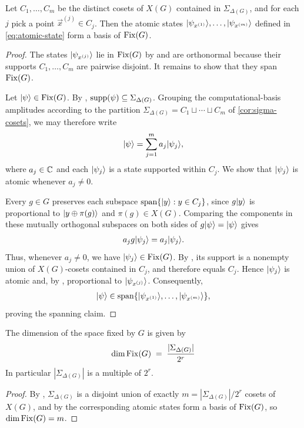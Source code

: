 \begin{theorem}\label{thm:atomic-basis}
    Let $C_1, \dots, C_m$ be the distinct cosets of $X(G)$ contained in $\Sigma_{\Delta(G)}$, and for each $j$ pick a point $\vec{x}^{(j)} \in C_j$. Then the atomic states $|\psi_{x^{(1)}}\rangle, \dots, |\psi_{x^{(m)}}\rangle$ defined in \cref{eq:atomic-state} form a basis of $\operatorname{Fix}(G)$.
\end{theorem}
\begin{proof}
    The states $|\psi_{x^{(j)}}\rangle$ lie in $\operatorname{Fix}(G)$ by  and are orthonormal because their supports $C_1,\ldots,C_m$ are pairwise disjoint.
    It remains to show that they span $\operatorname{Fix}(G)$.

    Let $|\psi\rangle\in\operatorname{Fix}(G)$.
    By , $\operatorname{supp}(\psi)\subseteq\Sigma_{\Delta(G)}$.
    Grouping the computational-basis amplitudes according to the partition $\Sigma_{\Delta(G)}=C_1\sqcup\cdots\sqcup C_m$ of \cref{cor:sigma-cosets}, we may therefore write
    \begin{align}
        |\psi\rangle=\sum_{j=1}^m a_j|\psi_j\rangle,
    \end{align}
    where $a_j\in\mathbb{C}$ and each $|\psi_j\rangle$ is a state supported within $C_j$. We show that $|\psi_j\rangle$ is atomic whenever $a_j\neq0$.

    Every $g\in G$ preserves each subspace $\operatorname{span}\{|y\rangle:y\in C_j\}$, since $g|y\rangle$ is proportional to $|y\oplus\pi(g)\rangle$ and $\pi(g)\in X(G)$.
    Comparing the components in these mutually orthogonal subspaces on both sides of $g|\psi\rangle=|\psi\rangle$ gives
    \begin{align}
        a_jg|\psi_j\rangle=a_j|\psi_j\rangle.
    \end{align}
    Thus, whenever $a_j\neq0$, we have $|\psi_j\rangle\in\operatorname{Fix}(G)$.
    By , its support is a nonempty union of $X(G)$-cosets contained in $C_j$, and therefore equals $C_j$.
    Hence $|\psi_j\rangle$ is atomic and, by , proportional to $|\psi_{x^{(j)}}\rangle$.
    Consequently,
    \begin{align}
        |\psi\rangle\in\operatorname{span}\{|\psi_{x^{(1)}}\rangle,\ldots,|\psi_{x^{(m)}}\rangle\},
    \end{align}
    proving the spanning claim.
\end{proof}

\begin{corollary}\label{cor:dimension-dcp-space}
    The dimension of the space fixed by $G$ is given by
    \begin{align}
        \dim \operatorname{Fix}(G) \;=\; \frac{|\Sigma_{\Delta(G)}|}{2^{r}}
    \end{align}
    In particular $|\Sigma_{\Delta(G)}|$ is a multiple of $2^r$.
\end{corollary}
\begin{proof}
    By , $\Sigma_{\Delta(G)}$ is a disjoint union of exactly $m = |\Sigma_{\Delta(G)}| / 2^r$ cosets of $X(G)$, and by  the corresponding atomic states form a basis of $\operatorname{Fix}(G)$, so $\dim \operatorname{Fix}(G) = m$.
\end{proof}


